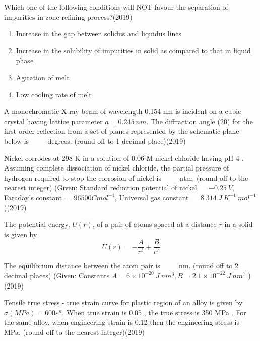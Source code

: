     \item Which one of the following conditions will NOT favour the separation of impurities in zone refining process?\hfill{(2019)}

       
            \begin{enumerate}
             \item  Increase in the gap between solidus and liquidus lines
\item  Increase in the solubility of impurities in solid as compared to that in liquid phase
\item Agitation of melt
\item  Low cooling rate of melt
            \end{enumerate}
       


    \item A monochromatic X-ray beam of wavelength 0.154 nm is incident on a cubic crystal having lattice parameter ${a}=0.245 {~nm}$. The diffraction angle (20) for the first order reflection from a set of planes represented by the schematic plane below is $\qquad$ degrees. (round off to 1 decimal place)\hfill{(2019)}

    
    \newpage
		

 
    \item Nickel corrodes at 298 K in a solution of 0.06 M nickel chloride having pH 4 . Assuming complete dissociation of nickel chloride, the partial pressure of hydrogen required to stop the corrosion of nickel is $\qquad$ atm. (round off to the nearest integer)
(Given: Standard reduction potential of nickel $=-0.25 {~V}$,
Faraday's constant $=96500 {C} {mol}^{-1}$, Universal gas constant $=8.314 {~J} {~K}^{-1} {~mol}^{-1}$ )\hfill{(2019)}

		


    \item The potential energy, ${U}(r)$, of a pair of atoms spaced at a distance $r$ in a solid is given by
$$
{U}(r)=-\frac{A}{r^{3}}+\frac{B}{r^{7}}
$$

The equilibrium distance between the atom pair is $\qquad$ nm.
(round off to 2 decimal places)
(Given: Constants $A=6 \times 10^{-20} {~J} {~nm}^{3}, B=2.1 \times 10^{-22} {~J} {~nm}^{7}$ )\hfill{(2019)}


    \item  Tensile true stress - true strain curve for plastic region of an alloy is given by $\sigma({MPa})=600 \varepsilon^{n}$.
When true strain is 0.05 , the true stress is 350 MPa . For the same alloy, when engineering strain is 0.12 then the engineering stress is $\qquad$ MPa. (round off to the nearest integer)\hfill{(2019)}



